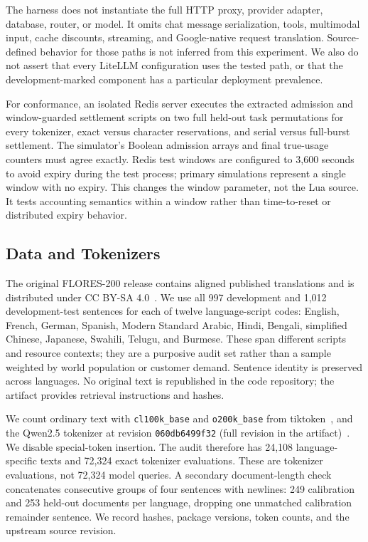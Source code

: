 \documentclass[manuscript,screen]{acmart}
\begin{document}
The harness does not instantiate the full HTTP proxy, provider adapter, database, router, or model. It omits chat message serialization, tools, multimodal input, cache discounts, streaming, and Google-native request translation. Source-defined behavior for those paths is not inferred from this experiment. We also do not assert that every LiteLLM configuration uses the tested path, or that the development-marked component has a particular deployment prevalence.

For conformance, an isolated Redis server executes the extracted admission and window-guarded settlement scripts on two full held-out task permutations for every tokenizer, exact versus character reservations, and serial versus full-burst settlement. The simulator's Boolean admission arrays and final true-usage counters must agree exactly. Redis test windows are configured to 3,600 seconds to avoid expiry during the test process; primary simulations represent a single window with no expiry. This changes the window parameter, not the Lua source. It tests accounting semantics within a window rather than time-to-reset or distributed expiry behavior.

\subsection{Data and Tokenizers}
The original FLORES-200 release contains aligned published translations and is distributed under CC BY-SA 4.0~\cite{flores}. We use all 997 development and 1,012 development-test sentences for each of twelve language-script codes: English, French, German, Spanish, Modern Standard Arabic, Hindi, Bengali, simplified Chinese, Japanese, Swahili, Telugu, and Burmese. These span different scripts and resource contexts; they are a purposive audit set rather than a sample weighted by world population or customer demand. Sentence identity is preserved across languages. No original text is republished in the code repository; the artifact provides retrieval instructions and hashes.

We count ordinary text with \texttt{cl100k\_base} and \texttt{o200k\_base} from tiktoken~\cite{tiktoken}, and the Qwen2.5 tokenizer at revision \texttt{060db6499f32} (full revision in the artifact)~\cite{qwen}. We disable special-token insertion. The audit therefore has 24,108 language-specific texts and 72,324 exact tokenizer evaluations. These are tokenizer evaluations, not 72,324 model queries. A secondary document-length check concatenates consecutive groups of four sentences with newlines: 249 calibration and 253 held-out documents per language, dropping one unmatched calibration remainder sentence. We record hashes, package versions, token counts, and the upstream source revision.
\end{document}
